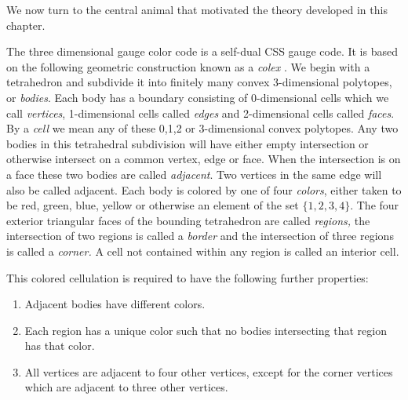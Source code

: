 %

We now turn to the central animal that motivated
the theory developed in this chapter.

The three dimensional gauge color code \cite{Bombin2015,Bombin2015single,Kubica2015}
is a self-dual CSS gauge code. 
It is based on the following geometric construction known
as a \emph{colex} \cite{Bombin2007exact}.
We begin with a tetrahedron and subdivide it into finitely many
convex 3-dimensional polytopes, or \emph{bodies}.
Each body has a boundary consisting of 0-dimensional cells
which we call \emph{vertices}, 1-dimensional cells called \emph{edges}
and 2-dimensional cells called \emph{faces}.
By a \emph{cell} we mean any of these 0,1,2 or 3-dimensional convex polytopes.
Any two bodies in this tetrahedral subdivision will
have either empty intersection or otherwise intersect
on a common vertex, edge or face.
When the intersection is on a face these two bodies
are called \emph{adjacent}.
Two vertices in the same edge will also be called adjacent.
Each body is colored by one of four \emph{colors},
either taken to be red, green, blue, yellow or 
otherwise an element of the set $\{1, 2, 3, 4\}.$
The four exterior triangular faces of the bounding tetrahedron are
called \emph{regions,} the intersection of two regions is called
a \emph{border} and the intersection of three regions is called
a \emph{corner.}
A cell not contained within any region is called an interior cell.

This colored cellulation is required to have the following further properties:
\begin{enumerate}
\item Adjacent bodies have different colors.
\item Each region has a unique color 
such that no bodies intersecting that region has that color.
\item All vertices are adjacent to four other vertices,
except for the corner vertices which are adjacent to three other vertices.
\end{enumerate}

